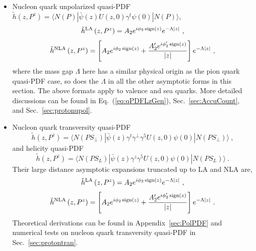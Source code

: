 \documentclass[a4paper,11pt]{article}
\begin{document}
\begin{itemize}
For valence combination, the parameters are constrained by isospin symmetry: $\phi_2=\phi'_2=0$, $\phi_3 = -\phi_1$, $\phi'_3 = -\phi'_1$, $A_1=A_3$, and $A'_1 = A'_3$. For sea quarks (including light and heavy quarks),  $A_1 = A_3 =A'_1 = A'_3 = 0$ since the corresponding mass gaps are associated with four-quark states with the combined quantum numbers of a light meson and a heavy meson, and are therefore larger than those of a single heavy meson. 

The general mathematical structure of the above results can be found in Eq.~(\ref{eq:qPDFLzGen}), the accuracy counting for the pion valence PDF in Sec.~\ref{sec:AccuCount}, and the numerical tests in Sec.~\ref{sec:pionval}.

\item Nucleon quark unpolarized quasi-PDF $\tilde{h}\left(z,P^z\right) =\langle N(P) | \bar{\psi}(z) U(z,0) \gamma^t \psi(0) | N(P)  \rangle$,
\begin{align}
\tilde{h}^{\rm LA}\left(z,P^z\right) = 
A_2 e^{i \phi_2 \, {\rm sign}(z)} e^{-\Lambda |z|}  \ ,
\end{align}
\begin{align}
\tilde{h}^{\rm NLA}\left(z,P^z\right) = 
\left[A_2 e^{i \phi_2 \, {\rm sign}(z)} +  \frac{A'_2 e^{i \phi'_2 \, {\rm sign}(z)}}{|z|} \right] e^{-\Lambda |z|}  \ ,
\end{align}
where the mass gap $\Lambda$ here has a similar physical origin as the pion quark quasi-PDF case, so does the $\Lambda$ in all the other asymptotic forms in this section. The above formats apply to valence and sea quarks. More detailed discussions can be found in Eq.~(\ref{eq:qPDFLzGen}), Sec.~\ref{sec:AccuCount}, and Sec.~\ref{sec:protonupol}.

\item Nucleon quark transversity quasi-PDF $$\tilde{h}\left(z,P^z\right) =\langle N(P S_{\perp})| \bar{\psi}(z) \gamma^t \gamma^{\perp} \gamma^5 U(z,0) \psi(0) | N(P S_{\perp}) \rangle \ ,$$ and helicity quasi-PDF $$\tilde{h}\left(z,P^z\right) =\langle N(P S_{L}) | \bar{\psi}(z) \gamma^z \gamma^5 U(z,0) \psi(0) | N(P S_{L}) \rangle \ .$$
Their large distance asymptotic expansions truncated up to LA and NLA are,
\begin{align}
\tilde{h}^{\rm LA}\left(z,P^z\right) = 
A_2 e^{i \phi_2 \, {\rm sign}(z)} e^{-\Lambda |z|}  \ ,
\end{align}
\begin{align}
\tilde{h}^{\rm NLA}\left(z,P^z\right) = 
\left[A_2 e^{i \phi_2 \, {\rm sign}(z)} +  \frac{A'_2 e^{i \phi'_2 \, {\rm sign}(z)}}{|z|} \right] e^{-\Lambda |z|}  \ .
\end{align}
Theoretical derivations can be found in Appendix~\ref{sec:PolPDF} and numerical tests on nucleon quark transversity quasi-PDF in Sec.~\ref{sec:protontran}. 


\end{itemize}
\end{document}
